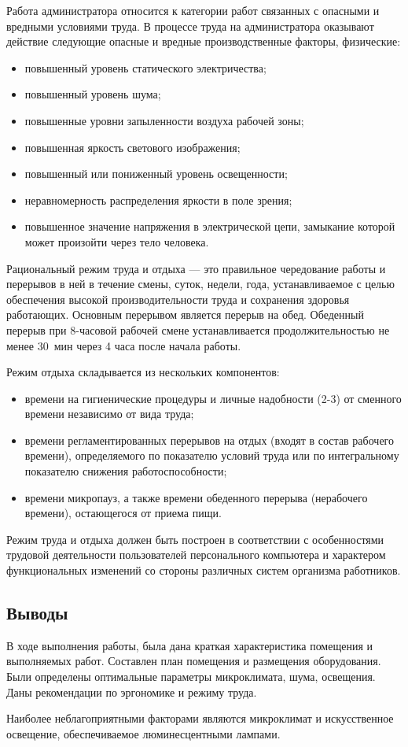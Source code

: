 Работа администратора относится к категории работ связанных с опасными и вредными условиями труда.
В процессе труда на администратора оказывают действие следующие опасные и вредные производственные факторы, физические:
\begin{itemize}
  \item повышенный уровень статического электричества;
  \item повышенный уровень шума;
  \item повышенные уровни запыленности воздуха рабочей зоны;
  \item повышенная яркость светового изображения;
  \item повышенный или пониженный уровень освещенности;
  \item неравномерность распределения яркости в поле зрения;
  \item повышенное значение напряжения в электрической цепи, замыкание которой может произойти через тело человека.
\end{itemize}

Рациональный режим труда и отдыха --- это правильное чередование работы и перерывов в ней в течение смены, суток, недели, года, устанавливаемое с целью обеспечения высокой производительности труда и сохранения здоровья работающих.
Основным перерывом является перерыв на обед.
Обеденный перерыв при 8-часовой рабочей смене устанавливается продолжительностью не менее 30~мин через 4 часа после начала работы.

Режим отдыха складывается из нескольких компонентов:
\begin{itemize}
  \item времени на гигиенические процедуры и личные надобности (2-3) от сменного времени независимо от вида труда;
  \item времени регламентированных перерывов на отдых (входят в состав рабочего времени), определяемого по показателю условий труда или по интегральному показателю снижения работоспособности;
  \item времени микропауз, а также времени обеденного перерыва (нерабочего времени), остающегося от приема пищи.
\end{itemize}

Режим труда и отдыха должен быть построен в соответствии с особенностями трудовой деятельности пользователей персонального компьютера и характером функциональных изменений со стороны различных систем организма работников.

\subsection{Выводы}

В ходе выполнения работы, была дана краткая характеристика помещения и выполняемых работ.
Составлен план помещения и размещения оборудования.
Были определены оптимальные параметры микроклимата, шума, освещения.
Даны рекомендации по эргономике и режиму труда.

Наиболее неблагоприятными факторами являются микроклимат и искусственное освещение, обеспечиваемое люминесцентными лампами.

\clearpage
